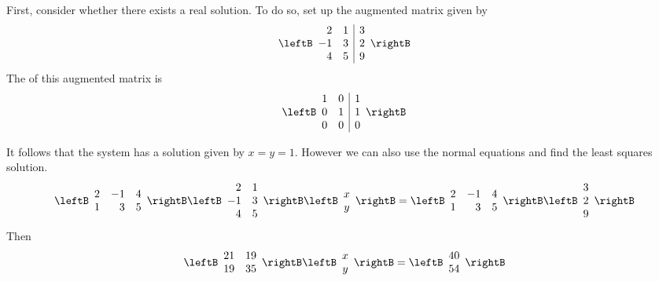 \begin{solution}
First, consider whether there exists a real solution. To do so, set up the augmented matrix given by
\begin{equation*}
\leftB
\begin{array}{rr|r}
2 & 1 & 3 \\ 
-1 & 3 & 2 \\ 
4 & 5 & 9
\end{array}
\rightB
\end{equation*}
The \rref\; of this augmented matrix is 
\begin{equation*}
\leftB
\begin{array}{rr|r}
1 & 0 & 1 \\ 
0 & 1 & 1 \\ 
0 & 0 & 0
\end{array}
\rightB
\end{equation*}

It follows that the system has a solution given by $x=y=1$. However we can also use the normal equations and find
the least squares solution. 
\begin{equation*}
\leftB 
\begin{array}{rrr}
2 & -1 & 4 \\ 
1 & 3 & 5
\end{array}
\rightB \leftB 
\begin{array}{rr}
2 & 1 \\ 
-1 & 3 \\ 
4 & 5
\end{array}
\rightB \leftB 
\begin{array}{c}
x \\ 
y
\end{array}
\rightB =\leftB 
\begin{array}{rrr}
2 & -1 & 4 \\ 
1 & 3 & 5
\end{array}
\rightB \leftB 
\begin{array}{r}
3 \\ 
2 \\ 
9
\end{array}
\rightB
\end{equation*}
Then
\begin{equation*}
\leftB 
\begin{array}{rr}
21 & 19 \\ 
19 & 35
\end{array}
\rightB \leftB 
\begin{array}{c}
x \\ 
y
\end{array}
\rightB =\leftB 
\begin{array}{c}
40 \\ 
54
\end{array}
\rightB
\end{equation*}


\end{solution}
